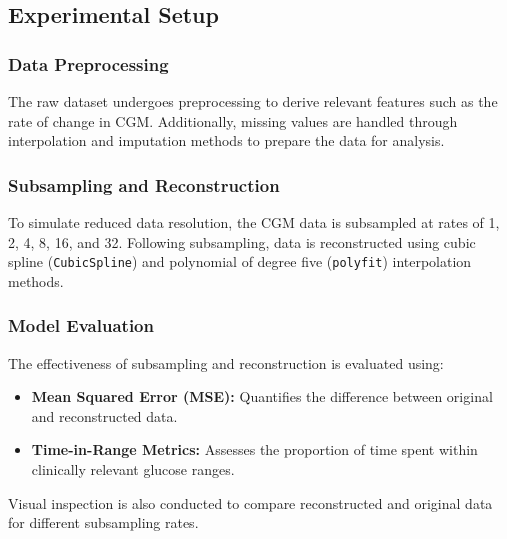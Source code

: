 \subsection{Experimental Setup}


\subsubsection{Data Preprocessing}
The raw dataset undergoes preprocessing to derive relevant features such as the rate of change in CGM. Additionally, missing values are handled through interpolation and imputation methods to prepare the data for analysis.

\subsubsection{Subsampling and Reconstruction}
To simulate reduced data resolution, the CGM data is subsampled at rates of 1, 2, 4, 8, 16, and 32. Following subsampling, data is reconstructed using cubic spline (\texttt{CubicSpline}) and polynomial of degree five (\texttt{polyfit}) interpolation methods. 


\subsubsection{Model Evaluation}
The effectiveness of subsampling and reconstruction is evaluated using:
\begin{itemize}
	\item \textbf{Mean Squared Error (MSE):} Quantifies the difference between original and reconstructed data.
	\item \textbf{Time-in-Range Metrics:} Assesses the proportion of time spent within clinically relevant glucose ranges.
\end{itemize}
Visual inspection is also conducted to compare reconstructed and original data for different subsampling rates.



















